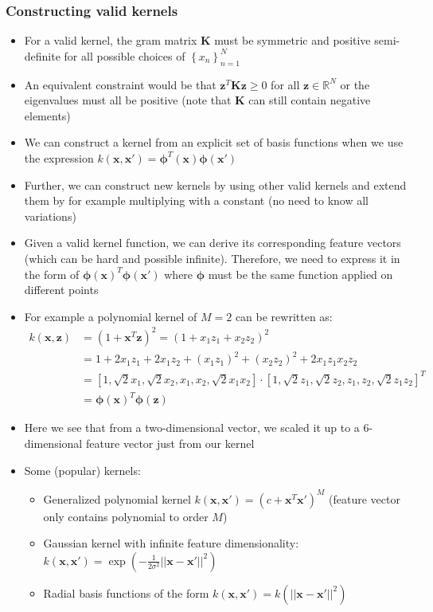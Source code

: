 \subsubsection{Constructing valid kernels}
\begin{itemize}
	\item For a valid kernel, the gram matrix $\bm{K}$ must be symmetric and positive semi-definite for all possible choices of $\left\{x_n\right\}_{n=1}^{N}$
	\item An equivalent constraint would be that $\bm{z}^T \bm{K} \bm{z} \geq 0$ for all $\bm{z}\in\mathbb{R}^{N}$ or the eigenvalues must all be positive (note that $\bm{K}$ can still contain negative elements)
	\item We can construct a kernel from an explicit set of basis functions when we use the expression $k\left(\bm{x},\bm{x}'\right)=\bm{\phi}^T(\bm{x})\bm{\phi}(\bm{x}')$
	\item Further, we can construct new kernels by using other valid kernels and extend them by for example multiplying with a constant (no need to know all variations)
	\item Given a valid kernel function, we can derive its corresponding feature vectors (which can be hard and possible infinite). Therefore, we need to express it in the form of $\bm{\phi}(\bm{x})^T \bm{\phi}(\bm{x}')$ where $\bm{\phi}$ must be the same function applied on different points
	\item For example a polynomial kernel of $M=2$ can be rewritten as:
	\begin{equation*}
		\begin{split}
			k\left(\bm{x},\bm{z}\right) & = \left(1+\bm{x}^T\bm{z}\right)^2 = \left(1 + x_1 z_1 + x_2 z_2\right)^2\\
			& = 1 + 2x_1 z_1 + 2x_1 z_2 + (x_1 z_1)^2 + (x_2 z_2)^2 + 2 x_1 z_1 x_2 z_2\\
			& = \left[1, \sqrt{2}x_1, \sqrt{2}x_2, x_1, x_2, \sqrt{2}x_1 x_2\right] \cdot \left[1, \sqrt{2}z_1, \sqrt{2}z_2, z_1, z_2, \sqrt{2}z_1 z_2\right]^T\\
			& = \bm{\phi}(\bm{x})^T \bm{\phi}(\bm{z})
		\end{split}
	\end{equation*}
	\item Here we see that from a two-dimensional vector, we scaled it up to a 6-dimensional feature vector just from our kernel
	\item Some (popular) kernels:
	\begin{itemize}
		\item Generalized polynomial kernel $k\left(\bm{x}, \bm{x}'\right) = \left(c + \bm{x}^T \bm{x}'\right)^{M}$ (feature vector only contains polynomial to order $M$)
		\item Gaussian kernel with infinite feature dimensionality: $k\left(\bm{x}, \bm{x}'\right) = \exp\left(-\frac{1}{2\sigma^2} ||\bm{x}-\bm{x}'||^2\right)$
		\item Radial basis functions of the form $k\left(\bm{x}, \bm{x}'\right) = k\left(||\bm{x}-\bm{x}'||^2\right)$
	\end{itemize}
\end{itemize}
